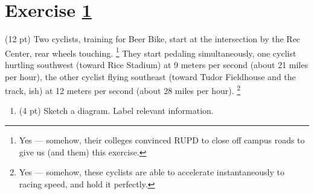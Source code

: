




%
%
%
%


\newpage

\section{Exercise \ref{sec : Math112 Spring2022 Exam1 Q6}}
\label{sec : Math112 Spring2022 Exam1 Q6}

(12 pt) Two cyclists, training for Beer Bike, start at the intersection by the Rec Center, rear wheels touching.%
\footnote{Yes --- somehow, their colleges convinced RUPD to close off campus roads to give us (and them) this exercise.} %
They start pedaling simultaneously, one cyclist hurtling southwest (toward Rice Stadium) at 9 meters per second (about 21 miles per hour), the other cyclist flying southeast (toward Tudor Fieldhouse and the track, ish) at 12 meters per second (about 28 miles per hour).%
\footnote{Yes --- somehow, these cyclists are able to accelerate instantaneously to racing speed, and hold it perfectly.}%

\begin{enumerate}[label=(\alph*)]
\item\label{itm : E1Q6a} (4 pt) Sketch a diagram. Label relevant information.
\end{enumerate}

